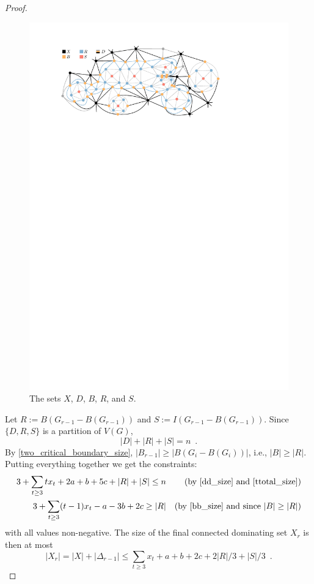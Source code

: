\documentclass{article}
\theoremstyle{definition}
\begin{document}
\begin{proof}
  \begin{figure}
      \centering
      \includegraphics{figs/dbrs}
          \caption{The sets $X$, $D$, $B$, $R$, and $S$.}
      \label{dbrs}
  \end{figure}

  Let $R:=B(G_{r-1}-B(G_{r-1}))$ and $S:=I(G_{r-1}-B(G_{r-1}))$.  Since $\{D,R,S\}$ is a partition of $V(G)$,
  \begin{equation}
    |D|+|R|+|S|= n \enspace . \label{ttotal_size}
  \end{equation}
  By \cref{two_critical_boundary_size}, $|B_{r-1}|\ge |B(G_i-B(G_i))|$, i.e., $|B|\ge |R|$.  Putting everything together we get the constraints:
  \begin{align}
        3 + \sum_{t\ge 3}tx_t + 2a + b + 5c + |R| + |S| \le n&
          & \text{(by \cref{dd_size} and \cref{ttotal_size})}  \label{a} \\
        3 + \sum_{t\ge 3}(t-1)x_t - a - 3b + 2c \ge |R|
          & & \text{(by \cref{bb_size} and since $|B|\ge |R|$)} \label{b} \\
  \end{align}
  with all values non-negative.  The size of the final connected dominating set $X_r$ is then at most
  \begin{equation}
    |X_r| = |X| + |\Delta_{r-1}| \le \sum_{t\ge 3}x_t + a + b + 2c + 2|R|/3 + |S|/3  \enspace . \label{oobjective}
  \end{equation}


\end{proof}
\end{document}
